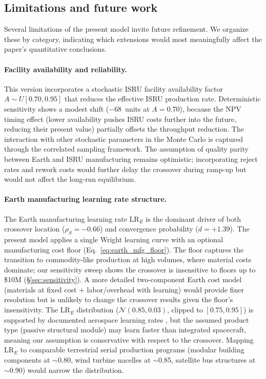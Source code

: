 \documentclass[preprint,12pt]{elsarticle}
\begin{document}
\subsection{Limitations and future work}

Several limitations of the present model invite future refinement. We organize these by category, indicating which extensions would most meaningfully affect the paper's quantitative conclusions.

\paragraph{Facility availability and reliability.} This version incorporates a stochastic ISRU facility availability factor $A \sim U[0.70, 0.95]$ that reduces the effective ISRU production rate. Deterministic sensitivity shows a modest shift ($-$68~units at $A = 0.70$), because the NPV timing effect (lower availability pushes ISRU costs further into the future, reducing their present value) partially offsets the throughput reduction. The interaction with other stochastic parameters in the Monte Carlo is captured through the correlated sampling framework. The assumption of quality parity between Earth and ISRU manufacturing remains optimistic; incorporating reject rates and rework costs would further delay the crossover during ramp-up but would not affect the long-run equilibrium.

\paragraph{Earth manufacturing learning rate structure.} The Earth manufacturing learning rate LR$_E$ is the dominant driver of both crossover location ($\rho_S = -0.66$) and convergence probability ($d = +1.39$). The present model applies a single Wright learning curve with an optional manufacturing cost floor (Eq.~\ref{eq:earth_mfg_floor}). The floor captures the transition to commodity-like production at high volumes, where material costs dominate; our sensitivity sweep shows the crossover is insensitive to floors up to \$10M (\S\ref{sec:sensitivity}). A more detailed two-component Earth cost model (materials at fixed cost $+$ labor/overhead with learning) would provide finer resolution but is unlikely to change the crossover results given the floor's insensitivity. The LR$_E$ distribution ($\mathcal{N}(0.85, 0.03)$, clipped to $[0.75, 0.95]$) is supported by documented aerospace learning rates \cite{wertz2011}, but the assumed product type (passive structural module) may learn faster than integrated spacecraft, meaning our assumption is conservative with respect to the crossover. Mapping LR$_E$ to comparable terrestrial serial production programs (modular building components at $\sim$0.80, wind turbine nacelles at $\sim$0.85, satellite bus structures at $\sim$0.90) would narrow the distribution.
\end{document}
